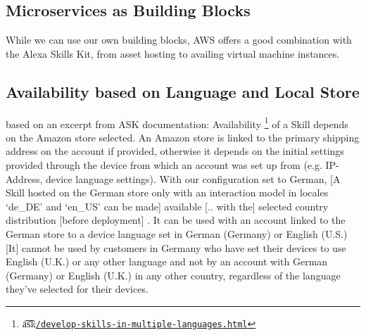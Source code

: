 	
	\subsection*{Microservices as Building Blocks} %
	While we can use our own building blocks, AWS offers a good combination with the Alexa Skills Kit, from asset hosting to availing virtual machine instances. 
	

	\subsection*{Availability based on Language and Local Store}
based on an excerpt from ASK documentation: Availability \footnote{\t{a\t{sk}}\href{https://developer.amazon.com/docs/custom-skills/develop-skills-in-multiple-languages.html}{\lstinline|/develop-skills-in-multiple-languages.html|}} of a Skill depends on the Amazon store selected. An Amazon store is linked to the primary shipping address on the account if provided, otherwise it depends on the initial settings provided through the device from which an account was set up from (e.g. IP-Address, device language settings). With our configuration set to German, 
%	
%		
[A Skill hosted on the German store only with an interaction model in locales `de\_DE' and `en\_US' can be made] \space available  [.. with the] selected country distribution [before deployment] \cite{alexaDesignGuide}.
It can be used with an account linked to the German store to a device language set in German (Germany) or English (U.S.) 
		[It] cannot be used by customers in Germany who have set their devices to use English (U.K.) or any other language
		and not by an account with German (Germany) or English (U.K.)
		in any other country, regardless of the language they've selected for their devices.
		
	
